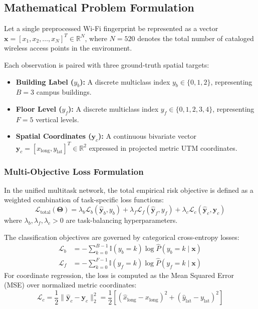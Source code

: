 \subsection{Mathematical Problem Formulation}
Let a single preprocessed Wi-Fi fingerprint be represented as a vector $\mathbf{x} = [x_1, x_2, \dots, x_N]^T \in \mathbb{R}^N$, where $N = 520$ denotes the total number of cataloged wireless access points in the environment.

Each observation is paired with three ground-truth spatial targets:
\begin{itemize}
    \item \textbf{Building Label ($y_b$):} A discrete multiclass index $y_b \in \{0, 1, 2\}$, representing $B = 3$ campus buildings.
    \item \textbf{Floor Level ($y_f$):} A discrete multiclass index $y_f \in \{0, 1, 2, 3, 4\}$, representing $F = 5$ vertical levels.
    \item \textbf{Spatial Coordinates ($\mathbf{y}_c$):} A continuous bivariate vector $\mathbf{y}_c = [x_{\text{long}}, y_{\text{lat}}]^T \in \mathbb{R}^2$ expressed in projected metric UTM coordinates.
\end{itemize}

\subsubsection{Multi-Objective Loss Formulation}
In the unified multitask network, the total empirical risk objective is defined as a weighted combination of task-specific loss functions:
\begin{equation}
    \mathcal{L}_{\text{total}}(\mathbf{\Theta}) = \lambda_b \mathcal{L}_b(\hat{\mathbf{y}}_b, y_b) + \lambda_f \mathcal{L}_f(\hat{\mathbf{y}}_f, y_f) + \lambda_c \mathcal{L}_c(\hat{\mathbf{y}}_c, \mathbf{y}_c)
    \label{eq:mtl-loss}
\end{equation}
where $\lambda_b, \lambda_f, \lambda_c > 0$ are task-balancing hyperparameters.

The classification objectives are governed by categorical cross-entropy losses:
\begin{align}
    \mathcal{L}_b &= -\sum_{k=0}^{B-1} \mathbb{I}(y_b = k) \log \hat{P}(y_b = k \mid \mathbf{x}) \\
    \mathcal{L}_f &= -\sum_{k=0}^{F-1} \mathbb{I}(y_f = k) \log \hat{P}(y_f = k \mid \mathbf{x})
\end{align}
For coordinate regression, the loss is computed as the Mean Squared Error (MSE) over normalized metric coordinates:
\begin{equation}
    \mathcal{L}_c = \frac{1}{2} \|\hat{\mathbf{y}}_c - \mathbf{y}_c\|_2^2 = \frac{1}{2} \left[ (\hat{x}_{\text{long}} - x_{\text{long}})^2 + (\hat{y}_{\text{lat}} - y_{\text{lat}})^2 \right]
\end{equation}

